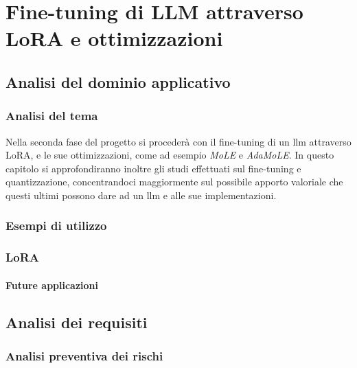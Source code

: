 \chapter{Fine-tuning di LLM attraverso LoRA e ottimizzazioni}
\label{chap:descrizione-stage-2}
\section{Analisi del dominio applicativo}
    \subsection{Analisi del tema}
    Nella seconda fase del progetto si procederà con il \gls{fine-tuning} di un \gls{llm} attraverso LoRA, e le sue ottimizzazioni, come ad esempio \textit{MoLE} e \textit{AdaMoLE}.
    In questo capitolo si approfondiranno inoltre gli studi effettuati sul \gls{fine-tuning} e quantizzazione, concentrandoci maggiormente sul possibile apporto valoriale che questi ultimi possono dare ad un \gls{llm} e alle sue implementazioni.

    \subsection{Esempi di utilizzo}
    \subsection{LoRA}
    \subsubsection{Future applicazioni} 

\section{Analisi dei requisiti}
    \subsection{Analisi preventiva dei rischi}
